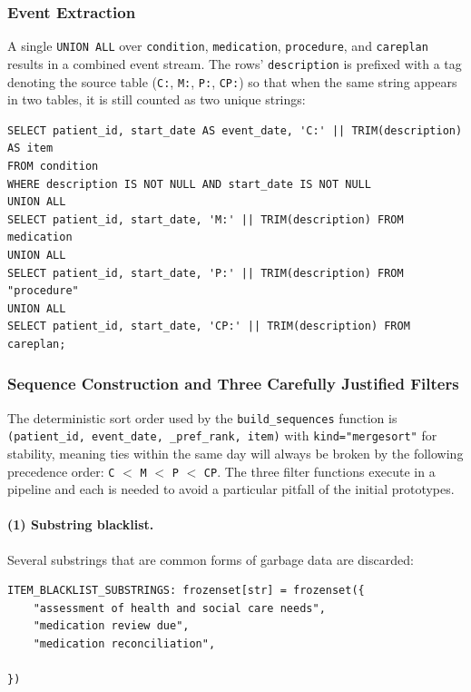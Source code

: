 \subsubsection*{Event Extraction}

A single \texttt{UNION ALL} over \texttt{condition}, \texttt{medication}, \texttt{procedure}, and \texttt{careplan} results in a combined event stream. The rows' \texttt{description} is prefixed with a tag denoting the source table (\texttt{C:}, \texttt{M:}, \texttt{P:}, \texttt{CP:}) so that when the same string appears in two tables, it is still counted as two unique strings:

\begin{lstlisting}[style=sqlstyle]
SELECT patient_id, start_date AS event_date, 'C:' || TRIM(description) AS item
FROM condition
WHERE description IS NOT NULL AND start_date IS NOT NULL
UNION ALL
SELECT patient_id, start_date, 'M:' || TRIM(description) FROM medication
UNION ALL
SELECT patient_id, start_date, 'P:' || TRIM(description) FROM "procedure"
UNION ALL
SELECT patient_id, start_date, 'CP:' || TRIM(description) FROM careplan;

\end{lstlisting}

\subsubsection*{Sequence Construction and Three Carefully Justified Filters}

The deterministic sort order used by the \texttt{build\_sequences} function is \texttt{(patient\_id, event\_date, \_pref\_rank, item)} with \texttt{kind="mergesort"} for stability, meaning ties within the same day will always be broken by the following precedence order: \texttt{C} \(<\) \texttt{M} \(<\) \texttt{P} \(<\) \texttt{CP}. The three filter functions execute in a pipeline and each is needed to avoid a particular pitfall of the initial prototypes.

\paragraph{(1) Substring blacklist.} Several substrings that are common forms of garbage data are discarded:

\begin{lstlisting}[style=pythonstyle]
ITEM_BLACKLIST_SUBSTRINGS: frozenset[str] = frozenset({
    "assessment of health and social care needs",
    "medication review due",
    "medication reconciliation",

})
\end{lstlisting}

